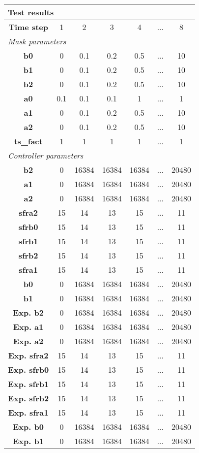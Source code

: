 \vspace{1em}
\begin{tabularx}{\textwidth}{|c|c|c|c|c|>{\centering\arraybackslash}X|c|}
\hline
\multicolumn{7}{|l|}{\cellcolor[gray]{0.8}\textbf{Test results}} \tabularnewline \hline
\textbf{Time step} & 1 & 2 & 3 & 4 & ... & 8 \tabularnewline \hline
\multicolumn{7}{|l|}{\cellcolor[gray]{0.9}\textit{Mask parameters}} \tabularnewline \hline
\textbf{b0} & 0 & 0.1 & 0.2 & 0.5 & ... & 10 \tabularnewline \hline
\textbf{b1} & 0 & 0.1 & 0.2 & 0.5 & ... & 10 \tabularnewline \hline
\textbf{b2} & 0 & 0.1 & 0.2 & 0.5 & ... & 10 \tabularnewline \hline
\textbf{a0} & 0.1 & 0.1 & 0.1 & 1 & ... & 1 \tabularnewline \hline
\textbf{a1} & 0 & 0.1 & 0.2 & 0.5 & ... & 10 \tabularnewline \hline
\textbf{a2} & 0 & 0.1 & 0.2 & 0.5 & ... & 10 \tabularnewline \hline
\textbf{ts\_fact} & 1 & 1 & 1 & 1 & ... & 1 \tabularnewline \hline
\multicolumn{7}{|l|}{\cellcolor[gray]{0.9}\textit{Controller parameters}} \tabularnewline \hline
\textbf{b2} & 0 & 16384 & 16384 & 16384 & ... & 20480 \tabularnewline \hline
\textbf{a1} & 0 & 16384 & 16384 & 16384 & ... & 20480 \tabularnewline \hline
\textbf{a2} & 0 & 16384 & 16384 & 16384 & ... & 20480 \tabularnewline \hline
\textbf{sfra2} & 15 & 14 & 13 & 15 & ... & 11 \tabularnewline \hline
\textbf{sfrb0} & 15 & 14 & 13 & 15 & ... & 11 \tabularnewline \hline
\textbf{sfrb1} & 15 & 14 & 13 & 15 & ... & 11 \tabularnewline \hline
\textbf{sfrb2} & 15 & 14 & 13 & 15 & ... & 11 \tabularnewline \hline
\textbf{sfra1} & 15 & 14 & 13 & 15 & ... & 11 \tabularnewline \hline
\textbf{b0} & 0 & 16384 & 16384 & 16384 & ... & 20480 \tabularnewline \hline
\textbf{b1} & 0 & 16384 & 16384 & 16384 & ... & 20480 \tabularnewline \hline
\textbf{Exp. b2} & 0 & 16384 & 16384 & 16384 & ... & 20480 \tabularnewline \hline
\textbf{Exp. a1} & 0 & 16384 & 16384 & 16384 & ... & 20480 \tabularnewline \hline
\textbf{Exp. a2} & 0 & 16384 & 16384 & 16384 & ... & 20480 \tabularnewline \hline
\textbf{Exp. sfra2} & 15 & 14 & 13 & 15 & ... & 11 \tabularnewline \hline
\textbf{Exp. sfrb0} & 15 & 14 & 13 & 15 & ... & 11 \tabularnewline \hline
\textbf{Exp. sfrb1} & 15 & 14 & 13 & 15 & ... & 11 \tabularnewline \hline
\textbf{Exp. sfrb2} & 15 & 14 & 13 & 15 & ... & 11 \tabularnewline \hline
\textbf{Exp. sfra1} & 15 & 14 & 13 & 15 & ... & 11 \tabularnewline \hline
\textbf{Exp. b0} & 0 & 16384 & 16384 & 16384 & ... & 20480 \tabularnewline \hline
\textbf{Exp. b1} & 0 & 16384 & 16384 & 16384 & ... & 20480 \tabularnewline \hline
\end{tabularx}
\vspace{1ex}

